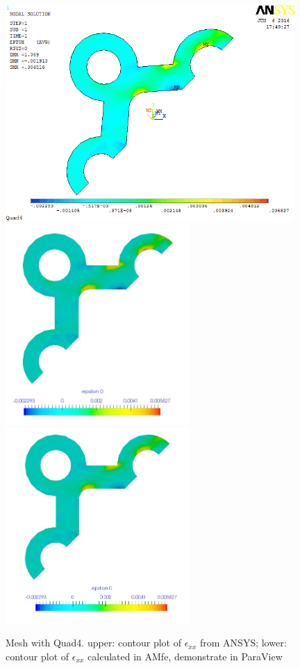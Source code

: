 \begin{figure}[htbp]
	\begin{center}
		\includegraphics[width=11cm,clip]{Quad4_Exx.png} 
		\includegraphics[width=7cm,clip]{Quad4_Exx_PD.png} 				
		\includegraphics[width=7cm,clip]{Quad4_Exx_P.png} 		
		\caption{Mesh with Quad4. upper: contour plot of $\epsilon_{xx}$ from ANSYS; lower: contour plot of $\epsilon_{xx}$ calculated in AMfe, demonstrate in ParaView} \label{fig: Quad4_Exx}
	\end{center}
\end{figure}
\clearpage 

